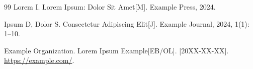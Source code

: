 \begin{thebibliography}{99}
Lorem I. Lorem Ipsum: Dolor Sit Amet[M]. Example Press, 2024.

Ipsum D, Dolor S. Consectetur Adipiscing Elit[J]. Example Journal, 2024, 1(1): 1--10.

Example Organization. Lorem Ipsum Example[EB/OL]. [20XX-XX-XX]. \url{https://example.com/}.

\end{thebibliography}
